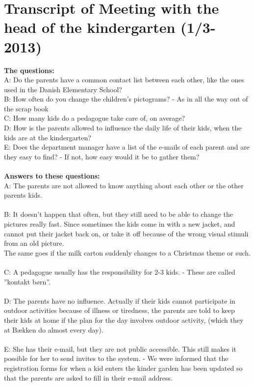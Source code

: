 \chapter{Transcript of Meeting with the head of the kindergarten (1/3-2013)}
\label{interviewMette}

\textbf{The questions:}\\
A: Do the parents have a common contact list between each other, like the ones used in the Danish Elementary School?\\
B: How often do you change the children's pictograms? - As in all the way out of the scrap book\\
C: How many kids do a pedagogue take care of, on average?\\
D: How is the parents allowed to influence the daily life of their kids, when the kids are at the kindergarten?\\
E: Does the department manager have a list of the e-mails of each parent and are they easy to find? - If not, how easy would it be to gather them?\\
\\
\textbf{Answers to these questions:}\\
A: The parents are not allowed to know anything about each other or the other parents kids.\\
\\
B: It doesn’t happen that often, but they still need to be able to change the pictures really fast. Since sometimes the kids come in with a new jacket, and cannot put their jacket back on, or take it off because of the wrong visual stimuli from an old picture.\\
The same goes if the milk carton suddenly changes to a Christmas theme or such.\\
\\
C: A pedagogue usually has the responsibility for 2-3 kids. - These are called ''kontakt børn''.\\
\\
D: The parents have no influence. Actually if their kids cannot participate in outdoor activities because of illness or tiredness, the parents are told to keep their kids at home if the plan for the day involves outdoor activity, (which they at Bækken do almost every day).\\
\\
E: She has their e-mail, but they are not public accessible. This still makes it possible for her to send invites to the system. - We were informed that the registration forms for when a kid enters the kinder garden has been updated so that the parents are asked to fill in their e-mail address.\\
